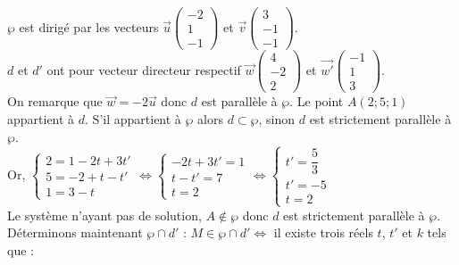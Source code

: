 \documentclass{cornouaille}
\begin{document}
\begin{methode*1}
$\wp$ est dirigé par les vecteurs $\vec{u} \begin {pmatrix} -2\\1\\-1 \end{pmatrix}$ et $\vec{v} \begin {pmatrix} 3\\-1\\-1 \end{pmatrix}$.\\
$d$ et $d'$ ont pour vecteur directeur respectif $\vec{w} \begin {pmatrix} 4\\-2\\2 \end{pmatrix}$ et $\vec{w'} \begin {pmatrix} -1\\1\\3 \end{pmatrix}$.\\
On remarque que $\overrightarrow{w}=-2\overrightarrow{u}$ donc $d$ est parallèle à $\wp$. Le point $A(2;5;1)$ appartient à $d$.
S'il appartient à $\wp$ alors $d\subset\wp$, sinon $d$ est strictement parallèle à $\wp$.\\
Or,  $\begin{cases} 2=1-2t+3t'\\5=-2+t-t'\\1=3-t \end{cases}\Leftrightarrow\begin{cases} -2t+3t'=1\\t-t'=7\\t=2 \end{cases}\Leftrightarrow\begin{cases} t'=\dfrac{5}{3}\\t'=-5\\t=2 \end{cases}$ \\
Le système n'ayant pas de solution, $A\not\in \wp$ donc $d$ est strictement parallèle à $\wp$.\\
Déterminons maintenant $\wp\cap d'$ :
$M\in\wp\cap d'\Leftrightarrow$ il existe trois réels $t$, $t'$ et $k$ tels que :\\

\end{methode*1}
\end{document}
